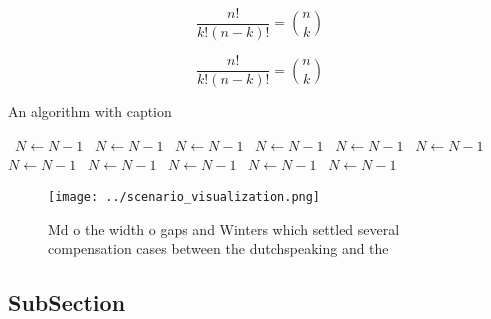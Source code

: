 \documentclass[a4paper]{article}
\begin{document}
\[ \frac{n!}{k!(n-k)!} = \binom{n}{k} \]

\[ \frac{n!}{k!(n-k)!} = \binom{n}{k} \]

\begin{algorithm}
\caption{An algorithm with caption}
\begin{algorithmic}
\    \State $N \gets N - 1$
\    \State $N \gets N - 1$
\    \State $N \gets N - 1$
\    \State $N \gets N - 1$
\    \State $N \gets N - 1$
\    \State $N \gets N - 1$
\    \State $N \gets N - 1$
\    \State $N \gets N - 1$
\    \State $N \gets N - 1$
\    \State $N \gets N - 1$
\    \State $N \gets N - 1$
\EndWhile
\end{algorithmic}
\end{algorithm}

\begin{figure}
\centering
\texttt{[image: ../scenario\_visualization.png]}
\caption{Md o the width o gaps and Winters which settled several compensation cases between the dutchspeaking and the 
}
\end{figure}
 
\subsection{SubSection}
\end{document}
